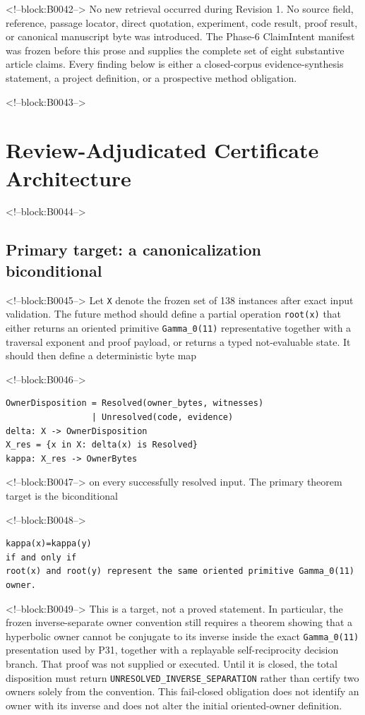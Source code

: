 \documentclass[11pt]{article}
\begin{document}
<!--block:B0042-->
No new retrieval occurred during Revision 1. No source field, reference,
passage locator, direct quotation, experiment, code result, proof
result, or canonical manuscript byte was introduced. The Phase-6
ClaimIntent manifest was frozen before this prose and supplies the
complete set of eight substantive article claims. Every finding below is
either a closed-corpus evidence-synthesis statement, a project
definition, or a prospective method obligation.

<!--block:B0043-->
\hypertarget{4-review-adjudicated-certificate-architecture}{%
\section{Review-Adjudicated Certificate
Architecture}\label{4-review-adjudicated-certificate-architecture}}

<!--block:B0044-->
\hypertarget{41-primary-target-a-canonicalization-biconditional}{%
\subsection{Primary target: a canonicalization
biconditional}\label{41-primary-target-a-canonicalization-biconditional}}

<!--block:B0045-->
Let \texttt{X} denote the frozen set of 138 instances after exact input
validation. The future method should define a partial operation
\texttt{root(x)} that either returns an oriented primitive
\texttt{Gamma\_0(11)} representative together with a traversal exponent
and proof payload, or returns a typed not-evaluable state. It should
then define a deterministic byte map

<!--block:B0046-->
\begin{verbatim}
OwnerDisposition = Resolved(owner_bytes, witnesses)
                 | Unresolved(code, evidence)
delta: X -> OwnerDisposition
X_res = {x in X: delta(x) is Resolved}
kappa: X_res -> OwnerBytes
\end{verbatim}

<!--block:B0047-->
on every successfully resolved input. The primary theorem target is the
biconditional

<!--block:B0048-->
\begin{verbatim}
kappa(x)=kappa(y)
if and only if
root(x) and root(y) represent the same oriented primitive Gamma_0(11) owner.
\end{verbatim}

<!--block:B0049-->
This is a target, not a proved statement. In particular, the frozen
inverse-separate owner convention still requires a theorem showing that a
hyperbolic owner cannot be conjugate to its inverse inside the exact
\texttt{Gamma\_0(11)} presentation used by P31, together with a replayable
self-reciprocity decision branch. That proof was not supplied or executed.
Until it is closed, the total disposition must return
\texttt{UNRESOLVED\_INVERSE\_SEPARATION} rather than certify two owners solely
from the convention. This fail-closed obligation does not identify an owner
with its inverse and does not alter the initial oriented-owner definition.
\end{document}
